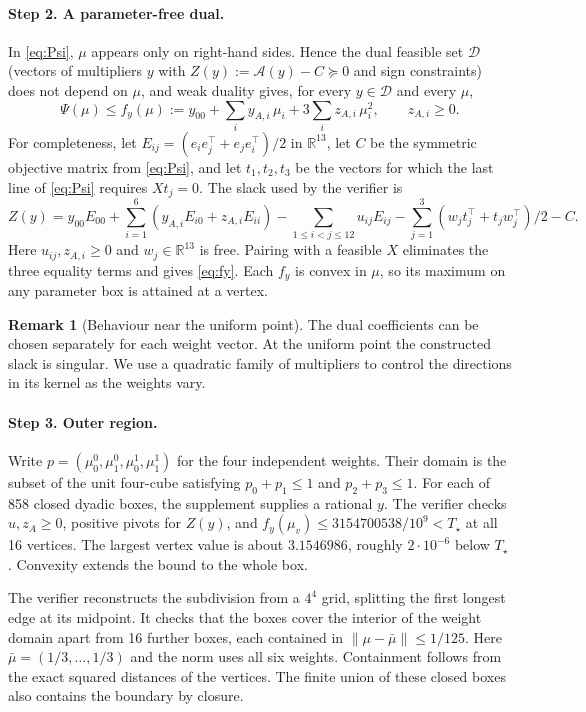 \documentclass[11pt]{article}
\theoremstyle{definition}
\newtheorem{remark}[theorem]{Remark}
\newcommand{\Tq}{T_{\star}}
\newcommand{\PSD}{\succeq}
\newcommand{\NBOX}{858}
\begin{document}
\paragraph{Step 2. A parameter-free dual.}
In \eqref{eq:Psi}, $\mu$ appears only on right-hand sides. Hence the dual feasible set $\mathcal D$ (vectors of
multipliers $y$ with $Z(y):=\mathcal A(y)-C\PSD0$ and sign constraints) does not depend on $\mu$, and weak duality gives,
for every $y\in\mathcal D$ and every $\mu$,
\begin{equation}\label{eq:fy}
\Psi(\mu)\le f_y(\mu):=y_{00}+\sum_i y_{A,i}\,\mu_i+3\sum_i z_{A,i}\,\mu_i^2,\qquad z_{A,i}\ge0 .
\end{equation}
For completeness, let $E_{ij}=(e_i e_j^\top+e_j e_i^\top)/2$ in $\mathbb R^{13}$,
let $C$ be the symmetric objective matrix from \eqref{eq:Psi}, and let $t_1,t_2,t_3$ be the vectors
for which the last line of \eqref{eq:Psi} requires $X t_j=0$. The slack used by the verifier is
\[
Z(y)=y_{00}E_{00}+\sum_{i=1}^6(y_{A,i}E_{i0}+z_{A,i}E_{ii})
-\sum_{1\le i<j\le12}u_{ij}E_{ij}
-\sum_{j=1}^3 (w_jt_j^\top+t_jw_j^\top)/2-C .
\]
Here $u_{ij},z_{A,i}\ge0$ and $w_j\in\mathbb R^{13}$ is free.
Pairing with a feasible $X$ eliminates the three equality terms and gives \eqref{eq:fy}.
Each $f_y$ is convex in $\mu$, so its maximum on any parameter box is attained at a vertex.

\begin{remark}[Behaviour near the uniform point]
The dual coefficients can be chosen separately for each weight vector. At the uniform
point the constructed slack is singular. We use a quadratic family of multipliers to
control the directions in its kernel as the weights vary.
\end{remark}

\paragraph{Step 3. Outer region.}
Write $p=(\mu^0_0,\mu^0_1,\mu^1_0,\mu^1_1)$ for the four independent weights.
Their domain is the subset of the unit four-cube satisfying
$p_0+p_1\le1$ and $p_2+p_3\le1$. For each of \NBOX{} closed dyadic boxes, the supplement supplies a
rational $y$. The verifier checks $u,z_A\ge0$, positive pivots for $Z(y)$, and
$f_y(\mu_v)\le3154700538/10^9<\Tq$ at all 16 vertices. The largest vertex value is about
$3.1546986$, roughly $2\cdot10^{-6}$ below $\Tq$. Convexity extends the bound to the whole box.

The verifier reconstructs the subdivision from a $4^4$ grid, splitting the first longest edge
at its midpoint. It checks that the boxes cover the interior of the weight domain apart from
16 further boxes, each contained in $\|\mu-\bar\mu\|\le1/125$. Here $\bar\mu=(1/3,\ldots,1/3)$
and the norm uses all six weights. Containment follows from the exact squared distances of the
vertices. The finite union of these closed boxes also contains the boundary by closure.
\end{document}
